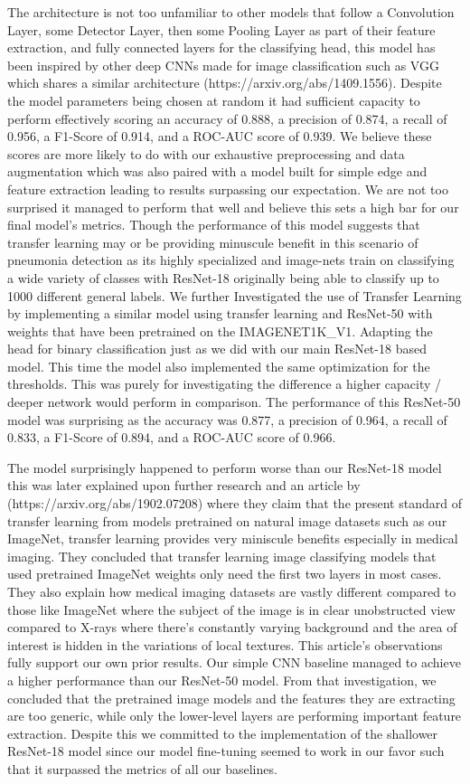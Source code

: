 \documentclass[11pt]{article}
\begin{document}
The architecture is not too unfamiliar to other models that follow a Convolution Layer, some Detector Layer, then some Pooling Layer as part of their feature extraction, and fully connected layers for the classifying head, this model has been inspired by other deep CNNs made for image classification such as VGG which shares a similar architecture (https://arxiv.org/abs/1409.1556).  Despite the model parameters being chosen at random it had sufficient capacity to perform effectively scoring an accuracy of 0.888, a precision of 0.874, a recall of 0.956, a F1-Score of 0.914, and a ROC-AUC score of 0.939. We believe these scores are more likely to do with our exhaustive preprocessing and data augmentation which was also paired with a model built for simple edge and feature extraction leading to results surpassing our expectation.  We are not too surprised it managed to perform that well and believe this sets a high bar for our final model’s metrics. Though the performance of this model suggests that transfer learning may or be providing minuscule benefit in this scenario of pneumonia detection as its highly specialized and image-nets train on classifying a wide variety of classes with ResNet-18 originally being able to classify up to 1000 different general labels.
We further Investigated the use of Transfer Learning by implementing a similar model using transfer learning and ResNet-50 with weights that have been pretrained on the IMAGENET1K\_V1. Adapting the head for binary classification just as we did with our main ResNet-18 based model. This time the model also implemented the same optimization for the thresholds. This was purely for investigating the difference a higher capacity / deeper network would perform in comparison. The performance of this ResNet-50 model was surprising as the accuracy was 0.877, a precision of 0.964, a recall of 0.833, a F1-Score of 0.894, and a ROC-AUC score of 0.966. 

The model surprisingly happened to perform worse than our ResNet-18 model this was later explained upon further research and an article by (https://arxiv.org/abs/1902.07208) where they claim that the present standard of transfer learning from models pretrained on natural image datasets such as our ImageNet, transfer learning provides very miniscule benefits especially in medical imaging. They concluded that transfer learning image classifying models that used pretrained ImageNet weights only need the first two layers in most cases. They also explain how medical imaging datasets are vastly different compared to those like ImageNet where the subject of the image is in clear unobstructed view compared to X-rays where there’s constantly varying background and the area of interest is hidden in the variations of local textures. This article’s observations fully support our own prior results. Our simple CNN baseline managed to achieve a higher performance than our ResNet-50 model. From that investigation, we concluded that the pretrained image models and the features they are extracting are too generic, while only the lower-level layers are performing important feature extraction. Despite this we committed to the implementation of the shallower ResNet-18 model since our model fine-tuning seemed to work in our favor such that it surpassed the metrics of all our baselines. 
\end{document}
